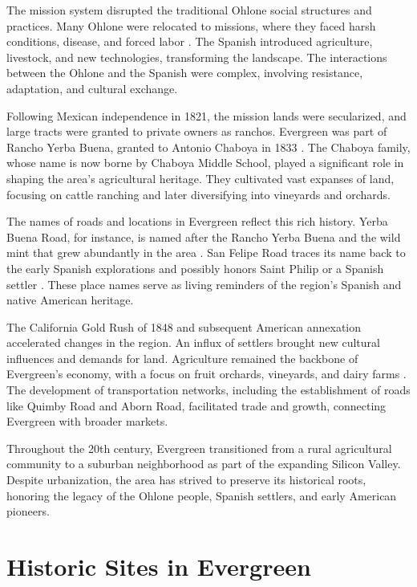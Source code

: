 \documentclass[12pt]{article}
\begin{document}
The mission system disrupted the traditional Ohlone social structures and practices. Many Ohlone were relocated to missions, where they faced harsh conditions, disease, and forced labor \cite{hurtado1988indian}. The Spanish introduced agriculture, livestock, and new technologies, transforming the landscape. The interactions between the Ohlone and the Spanish were complex, involving resistance, adaptation, and cultural exchange.

Following Mexican independence in 1821, the mission lands were secularized, and large tracts were granted to private owners as ranchos. Evergreen was part of Rancho Yerba Buena, granted to Antonio Chaboya in 1833 \cite{cityofsj}. The Chaboya family, whose name is now borne by Chaboya Middle School, played a significant role in shaping the area's agricultural heritage. They cultivated vast expanses of land, focusing on cattle ranching and later diversifying into vineyards and orchards.

The names of roads and locations in Evergreen reflect this rich history. Yerba Buena Road, for instance, is named after the Rancho Yerba Buena and the wild mint that grew abundantly in the area \cite{gudde1998california}. San Felipe Road traces its name back to the early Spanish explorations and possibly honors Saint Philip or a Spanish settler \cite{hohenthal1952california}. These place names serve as living reminders of the region's Spanish and native American heritage.

The California Gold Rush of 1848 and subsequent American annexation accelerated changes in the region. An influx of settlers brought new cultural influences and demands for land. Agriculture remained the backbone of Evergreen's economy, with a focus on fruit orchards, vineyards, and dairy farms \cite{mckay2007santa}. The development of transportation networks, including the establishment of roads like Quimby Road and Aborn Road, facilitated trade and growth, connecting Evergreen with broader markets.

Throughout the 20th century, Evergreen transitioned from a rural agricultural community to a suburban neighborhood as part of the expanding Silicon Valley. Despite urbanization, the area has strived to preserve its historical roots, honoring the legacy of the Ohlone people, Spanish settlers, and early American pioneers.

\section*{Historic Sites in Evergreen}
\end{document}
